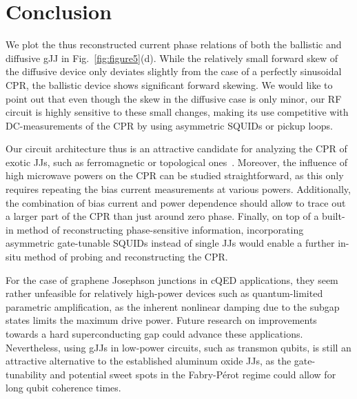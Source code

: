 \section{Conclusion}

We plot the thus reconstructed current phase relations of both the ballistic and diffusive gJJ in Fig.~\ref{fig:figure5}(d).
%
While the relatively small forward skew of the diffusive device only deviates slightly from the case of a perfectly sinusoidal CPR, the ballistic device shows significant forward skewing.
%
We would like to point out that even though the skew in the diffusive case is only minor, our RF circuit is highly sensitive to these small changes, making its use competitive with DC-measurements of the CPR by using asymmetric SQUIDs or pickup loops.

Our circuit architecture thus is an attractive candidate for analyzing the CPR of exotic JJs, such as ferromagnetic or topological ones~\cite{golubovCurrentphaseRelationJosephson2004a,sochnikovNonsinusoidalCurrentPhaseRelationship2015,stoutimoreSecondHarmonicCurrentPhaseRelation2018,assoulineSpinOrbitInducedPhaseshift2019}.
%
Moreover, the influence of high microwave powers on the CPR can be studied straightforward, as this only requires repeating the bias current measurements at various powers.
%
Additionally, the combination of bias current and power dependence should allow to trace out a larger part of the CPR than just around zero phase.
%
Finally, on top of a built-in method of reconstructing phase-sensitive information, incorporating asymmetric gate-tunable SQUIDs instead of single JJs would enable a further in-situ method of probing and reconstructing the CPR.

For the case of graphene Josephson junctions in cQED applications, they seem rather unfeasible for relatively high-power devices such as quantum-limited parametric amplification, as the inherent nonlinear damping due to the subgap states limits the maximum drive power.
%
Future research on improvements towards a hard superconducting gap could advance these applications.
%
Nevertheless, using gJJs in low-power circuits, such as transmon qubits, is still an attractive alternative to the established aluminum oxide JJs, as the gate-tunability and potential sweet spots in the Fabry-Pérot regime could allow for long qubit coherence times.


\pagebreak
\clearpage

